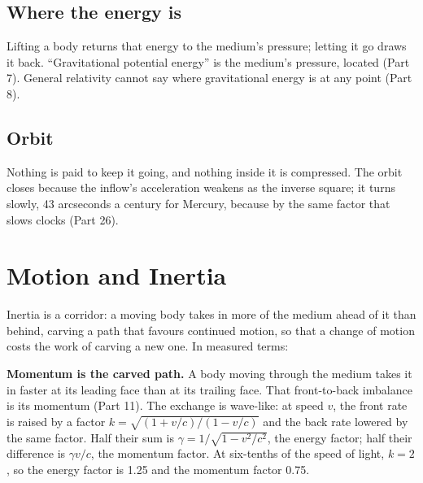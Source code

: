 \subsection{Where the energy is}

  Lifting a body returns that energy to the medium's pressure; letting it go draws it back. ``Gravitational potential energy'' is the medium's pressure, located (Part 7). General relativity cannot say where gravitational energy is at any point (Part 8).

\subsection{Orbit}

 Nothing is paid to keep it going, and nothing inside it is compressed. The orbit closes because the inflow's acceleration weakens as the inverse square; it turns slowly, 43 arcseconds a century for Mercury, because  by the same factor that slows clocks (Part 26).

\section{Motion and Inertia}

Inertia is a corridor: a moving body takes in more of the medium ahead of it than behind, carving a path that favours continued motion, so that a change of motion costs the work of carving a new one. In measured terms:

\begin{hypbar}
\textbf{Momentum is the carved path.} A body moving through the medium takes it in faster at its leading face than at its trailing face. That front-to-back imbalance is its momentum (Part 11). The exchange is wave-like: at speed $v$, the front rate is raised by a factor $k = \sqrt{(1+v/c)/(1-v/c)}$ and the back rate lowered by the same factor. Half their sum is $\gamma = 1/\sqrt{1-v^2/c^2}$, the energy factor; half their difference is $\gamma v/c$, the momentum factor. At six-tenths of the speed of light, $k = 2$, so the energy factor is 1.25 and the momentum factor 0.75.
\end{hypbar}

